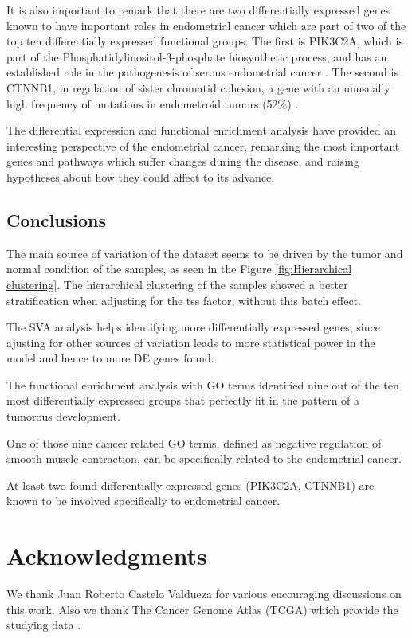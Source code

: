 \documentclass[9pt,twocolumn,twoside]{gsajnl}
\begin{document}
It is also important to remark that there are two differentially expressed genes known to have important roles in endometrial cancer which are part of two of the top ten differentially expressed functional groups. The first is PIK3C2A, which is part of the Phosphatidylinositol-3-phosphate biosynthetic process, and has an established role in the pathogenesis of serous endometrial cancer \citep{LeGallo2012}. The second is CTNNB1, in regulation of sister chromatid cohesion, a gene with an unusually high frequency of mutations in endometroid tumors (52\%) \citep{Getz2013}.

The differential expression and functional enrichment analysis have provided an interesting perspective of the endometrial cancer, remarking the most important genes and pathways which suffer changes during the disease, and raising hypotheses about how they could affect to its advance. 

\subsection*{Conclusions} 

The main source of variation of the dataset seems to be driven by the tumor and normal condition of the samples, as seen in the Figure \ref{fig:Hierarchical clustering}. The hierarchical clustering of the samples showed a better stratification when adjusting for the tss factor, without this batch effect. 

The SVA analysis helps identifying more differentially expressed genes, since ajusting for other sources of variation leads to more statistical power in the model and hence to more DE genes found. 

The functional enrichment analysis with GO terms identified nine out of the ten most differentially expressed groups that perfectly fit in the pattern of a tumorous development. 

One of those nine cancer related GO terms, defined as negative regulation of smooth muscle contraction, can be specifically related to the endometrial cancer. 

At least two found differentially expressed genes (PIK3C2A, CTNNB1) are known to be involved specifically to endometrial cancer. 

\section*{Acknowledgments}

We thank Juan Roberto Castelo Valdueza for various encouraging discussions on this work. Also we thank The Cancer Genome Atlas (TCGA) which provide the studying data .


\end{document}
